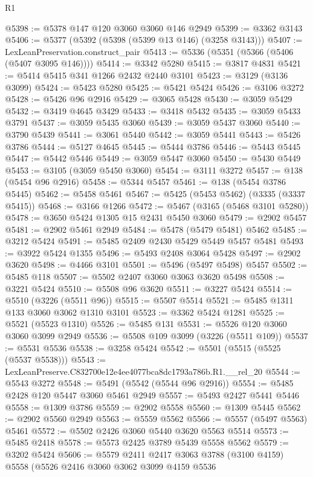 \begin{lexlean}{R1}
\begin{coremodule}
@5398 := @5378 @147 @120 @3060 @3060 @146 @2949
@5399 := @3362 @3143
@5406 := @5377 (@5392 (@5398 (@5399 @13 @146) (@3258 @3143)))
@5407 := LexLeanPreservation.construct_pair
@5413 := @5336 (@5351 (@5366 (@5406 (@5407 @3095 @146))))
@5414 := @3342 @5280
@5415 := @3817 @4831
@5421 := @5414 @5415 @341 @1266 @2432 @2440 @3101
@5423 := @3129 (@3136 @3099)
@5424 := @5423 @5280
@5425 := @5421 @5424
@5426 := @3106 @3272
@5428 := @5426 @96 @2916
@5429 := @3065 @5428
@5430 := @3059 @5429
@5432 := @3419 @4645 @3429
@5433 := @3418 @5432
@5435 := @3059 @5433 @3791
@5437 := @3059 @5435 @3060
@5439 := @3059 @5437 @3060
@5440 := @3790 @5439
@5441 := @3061 @5440
@5442 := @3059 @5441
@5443 := @5426 @3786
@5444 := @5127 @4645
@5445 := @5444 @3786
@5446 := @5443 @5445
@5447 := @5442 @5446
@5449 := @3059 @5447 @3060
@5450 := @5430 @5449
@5453 := @3105 (@3059 @5450 @3060)
@5454 := @3111 @3272
@5457 := @138 (@5454 @96 @2916)
@5458 := @5344 @5457
@5461 := @138 (@5454 @3786 @5445)
@5462 := @5458 @5461
@5467 := @5425 (@5453 @5462) (@3335 (@3337 @5415))
@5468 := @3166 @1266
@5472 := @5467 (@3165 (@5468 @3101 @5280))
@5478 := @3650 @5424 @1305 @15 @2431 @5450 @3060
@5479 := @2902 @5457
@5481 := @2902 @5461 @2949
@5484 := @5478 (@5479 @5481) @5462
@5485 := @3212 @5424
@5491 := @5485 @2409 @2430 @5429 @5449 @5457 @5481
@5493 := @3922 @5424 @1355
@5496 := @5493 @2408 @3064 @5428
@5497 := @2902 @3620
@5498 := @4466 @3101
@5501 := @5496 (@5497 @5498) @5457
@5502 := @5485 @118
@5507 := @5502 @2407 @3060 @3063 @3620 @5498
@5508 := @3221 @5424
@5510 := @5508 @96 @3620
@5511 := @3227 @5424
@5514 := @5510 (@3226 (@5511 @96))
@5515 := @5507 @5514
@5521 := @5485 @1311 @133 @3060 @3062 @1310 @3101
@5523 := @3362 @5424 @1281
@5525 := @5521 (@5523 @1310)
@5526 := @5485 @131
@5531 := @5526 @120 @3060 @3060 @3099 @2949
@5536 := @5508 @109 @3099 (@3226 (@5511 @109))
@5537 := @5531 @5536
@5538 := @3258 @5424
@5542 := @5501 (@5515 (@5525 (@5537 @5538)))
@5543 := LexLeanPreserve.C832700e12e4ee4077bca8dc1793a786b.R1.__rel_20
@5544 := @5543 @3272
@5548 := @5491 (@5542 (@5544 @96 @2916))
@5554 := @5485 @2428 @120 @5447 @3060 @5461 @2949
@5557 := @5493 @2427 @5441 @5446
@5558 := @1309 @3786
@5559 := @2902 @5558
@5560 := @1309 @5445
@5562 := @2902 @5560 @2949
@5563 := @5559 @5562
@5566 := @5557 (@5497 @5563) @5461
@5572 := @5502 @2426 @3060 @5440 @3620 @5563 @5514
@5573 := @5485 @2418
@5578 := @5573 @2425 @3789 @5439 @5558 @5562
@5579 := @3202 @5424
@5606 := @5579
    @2411
    @2417
    @3063
    @3788
    (@3100 @4159)
    @5558
    (@5526
      @2416
      @3060
      @3062
      @3099
      @4159
      @5536

\end{coremodule}
\end{lexlean}
